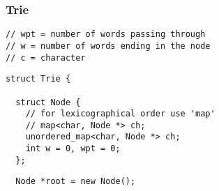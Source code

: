 \documentclass[twoside]{article}
\begin{document}
\begin{multicols*}{2}
\subsubsectionfont{\large\bfseries\sffamily\underline}
\subsubsection*{Trie}
\begin{verbatim}
// wpt = number of words passing through
// w = number of words ending in the node
// c = character
\end{verbatim}
\vspace{-12pt}
\begin{verbatim}
struct Trie {

  struct Node {
    // for lexicographical order use 'map'
    // map<char, Node *> ch;
    unordered_map<char, Node *> ch;
    int w = 0, wpt = 0;
  };
\end{verbatim}
\vspace{-12pt}
\begin{verbatim}
  Node *root = new Node();


\end{verbatim}
\end{multicols*}
\end{document}
